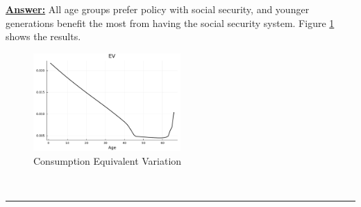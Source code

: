 \documentclass{article} %
\theoremstyle{definition}
\newenvironment{solution}[1][Answer]{\begin{singlespace}\underline{\textbf{#1:}}\quad }{\ \rule{0.3em}{0.3em}\end{singlespace}} %
\begin{document}
\begin{enumerate}
\begin{solution}
    All age groups prefer policy with social security, and younger generations benefit the most from having the social security system. Figure \ref{EV1} shows the results.

\begin{figure}[htbp]
    \begin{center}
      \includegraphics[width=0.5\textwidth]{Figures/EV.pdf}
	\caption{Consumption Equivalent Variation}
      \label{EV1}
    \end{center}
\end{figure}
    
  \end{solution}
\end{enumerate}
\end{document}
